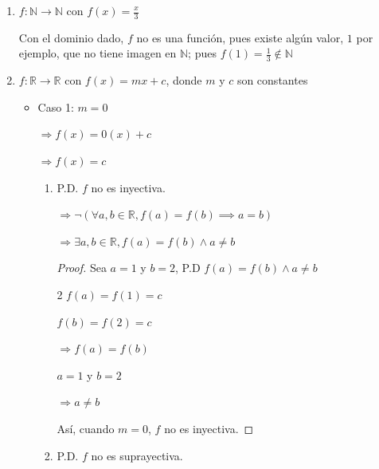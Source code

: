 \documentclass{article}
\begin{document}
\begin{enumerate}
\begin{enumerate}
        \item[d)] \(f: \mathbb{N} \rightarrow \mathbb{N} \text{ con } f(x) = \frac{x}{3}\)

        Con el dominio dado, \( f \) no es una función, pues existe algún valor, \( 1 \) por ejemplo, que no tiene imagen en \( \mathbb{N} \); pues \( f(1) = \frac{1}{3} \notin \mathbb{N} \)
        \vspace{\baselineskip}
        
        \item[e)] \(f:\mathbb{R}\rightarrow\mathbb{R} \text{ con } f(x) = mx + c\), donde \(m\) y \(c\) son constantes
        \begin{itemize}
            \item Caso 1: \(m = 0\)

            \(\Rightarrow f(x) = 0(x) + c\)
            
            \(\Rightarrow f(x) = c\)
            \begin{enumerate}
                \item[1.] P.D. \(f\) no es inyectiva.
                
                \(\Rightarrow \neg (\forall a, b \in \mathbb{R}, f(a) = f(b) \implies a = b)\)
                
                \(\Rightarrow \exists a, b \in \mathbb{R}, f(a) = f(b) \land a \neq b\)
                
                \begin{proof} Sea \(a = 1\) y \(b = 2\), P.D \(f(a) = f(b) \land a \neq b\)
                \begin{multicols}{2}
                    \(f(a) = f(1) = c\)
                    
                    \(f(b) = f(2) = c\)
                    \vspace{\baselineskip}

                    \(\Rightarrow f(a) = f(b)\)
                    \columnbreak
                    
                    \(a = 1\) y \(b = 2\)
                    \vspace{\baselineskip}
                    
                    \(\Rightarrow a \neq b\)
                \end{multicols}

                Así, cuando \(m = 0\), \(f\) no es inyectiva.
                
                \end{proof}
                \item[2.] P.D. \(f\) no es suprayectiva.
                

\end{enumerate}
\end{itemize}
\end{enumerate}
\end{enumerate}
\end{document}
